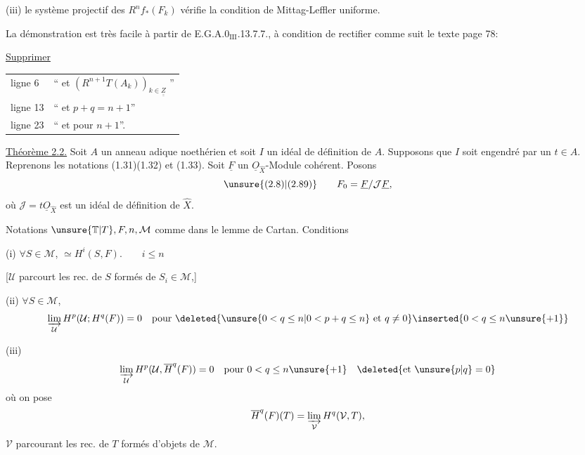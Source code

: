 (iii) le système projectif des $R^nf_*(F_k)$ vérifie
la condition de Mittag-Leffler uniforme.

La démonstration est très facile à partir de
E.G.A.$0_{\mathrm{III}}$.13.7.7., à condition de rectifier comme suit
le texte page 78:

\uline{Supprimer}

\begin{tabular}{ll}
ligne 6 & `` et $(R^{n+1}T(A_k))_{k\in\underline{\underline Z}}$ ''\\[1ex]
ligne 13 & `` et $p+q=n+1$''\\[1ex]
ligne 23 & `` et pour $n+1$''.
\end{tabular}

\uline{Théorème 2.2.} Soit $A$ un anneau adique noethérien et soit
$I$ un idéal de définition de $A$.
Supposons que $I$ soit engendré par un $t\in A$. Reprenons les notations (1.31)\inserted{,}(1.32) et
(1.33). Soit $\underline F$ un $\underline O_{\widehat X}$-Module cohérent. Posons
\[
\text{\unsure{(2.8)|(2.89)}}\qquad F_0=\underline F/\mathcal J\underline F,
\]
où $\mathcal J=t\underline O_{\widehat X}$ est un idéal de définition de $\widehat X$.

 Notations $\unsure{\mathbb T|T},F,n,\mathcal M$ comme dans le
lemme de Cartan. Conditions 

(i) $\forall S\in\mathcal M$,
$\simeq H^i(S,F).\qquad i\leq n$

[$\mathcal U$ parcourt les rec. de $S$ formés de $S_i\in\mathcal M$,]

(ii) $\forall S\in\mathcal M$, 
\[
\varinjlim_{\mathcal U}H^p(\mathcal U;H^q(F))=0\quad\text{pour }
\deleted{\unsure{0<q\leq n|0<p+q\leq n}\text{ et }q\ne0}\inserted{0<q\leq n\unsure{+1}}
\]

(iii)
\[
\varinjlim_{\mathcal U}H^p(\mathcal U,\overline H^q(F))=0\quad\text{pour }0<q\leq n\unsure{+1}
\quad\deleted{\text{et }\unsure{p|q}=0}
\]
où on pose
\[
\overline H^q(F)(T)=\varinjlim_{\mathcal V}H^q(\mathcal V,T),
\]
$\mathcal V$ parcourant les rec. de $T$ formés d'objets de $\mathcal M$.

